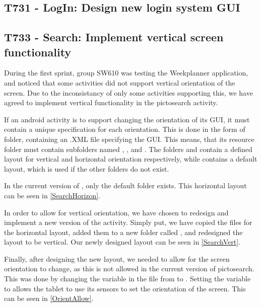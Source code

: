 \subsection{T731 - LogIn: Design new login system GUI}

\subsection{T733 - Search: Implement vertical screen functionality}
During the first sprint, group SW610 was testing the Weekplanner application,
and noticed that some activities did not support vertical orientation of the
screen. Due to the inconsistancy of only some activities supporting this, we
have agreed to implement vertical functionality in the pictosearch activity.\nl

If an android activity is to support changing the orientation of its GUI, it
must contain a unique specification for each orientation. This is done in the
form of folder, containing an .XML file specifying the GUI. This means, that its
resource folder  must contain subfolders named ,
, and . The folders 
and  contain a defined layout for vertical and horizontal
orientation respectively, while  contains a default layout, which
is used if the other folders do not exist.\nl

In the current version of , only the default folder
 exists. This horizontal layout can be seen in
\autoref{SearchHorizon}.

    
In order to allow for vertical orientation, we have chosen to redesign and
implement a new version of the activity. Simply put, we have copied the files
for the horizontal layout, added them to a new folder called
, and redesigned the layout to be vertical. Our newly
designed layout can be seen in \autoref{SearchVert}.


Finally, after designing the new layout, we needed to allow for the screen
orientation to change, as this is not allowed in the current version of
pictosearch. This was done by changing the 
variable in the  file from  to
. Setting the variable to  allows the tablet
to use its sensors to set the orientation of the screen. This can be seen in
\autoref{OrientAllow}.\nl

